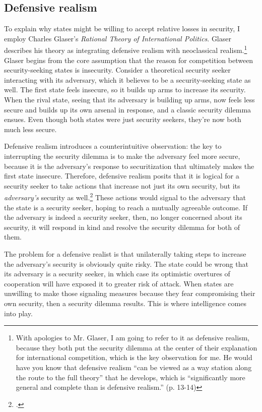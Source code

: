 \documentclass[14pt]{extarticle}
\begin{document}
\subsection{Defensive realism}
To explain why states might be willing to accept relative losses in security, I employ Charles Glaser's \emph{Rational Theory of International Politics}. Glaser describes his theory as integrating defensive realism with neoclassical realism.\footnote{With apologies to Mr. Glaser, I am going to refer to it as defensive realism, because they both put the security dilemma at the center of their explanation for international competition, which is the key observation for me. He would have you know that defensive realism \enquote{can be viewed as a way station along the route to the full theory} that he develops, which is \enquote{significantly more general and complete than is defensive realism.} (p. 13-14)} Glaser begins from the core assumption that the reason for competition between security-seeking states is insecurity. Consider a theoretical security seeker interacting with its adversary, which it believes to be a security-seeking state as well. The first state feels insecure, so it builds up arms to increase its security. When the rival state, seeing that its adversary is building up arms, now feels less secure and builds up its own arsenal in response, and a classic security dilemma ensues. Even though both states were just security seekers, they're now both much less secure.


Defensive realism introduces a counterintuitive observation: the key to interrupting the security dilemma is to make the adversary feel more secure, because it is the adversary's response to securitization that ultimately makes the first state insecure. Therefore, defensive realism posits that it is logical for a security seeker to take actions that increase not just its own security, but its \emph{adversary's} security as well.\footcite[p.~7]{glaser_rational_2010} These actions would signal to the adversary that the state is a security seeker, hoping to reach a mutually agreeable outcome. If the adversary is indeed a security seeker, then, no longer concerned about its security, it will respond in kind and resolve the security dilemma for both of them.

The problem for a defensive realist is that unilaterally taking steps to increase the adversary's security is obviously quite risky. The state could be wrong that its adversary is a security seeker, in which case its optimistic overtures of cooperation will have exposed it to greater risk of attack. When states are unwilling to make those signaling measures because they fear compromising their own security, then a security dilemma results. This is where intelligence comes into play.
\end{document}
